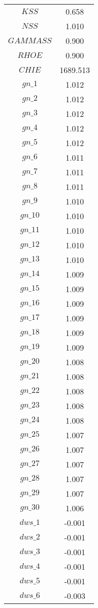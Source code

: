 \begin{center}
\begin{longtable}{cc}
$KSS$ 	 & 	 0.658 \\
$NSS$ 	 & 	 1.010 \\
$GAMMASS$ 	 & 	 0.900 \\
$RHOE$ 	 & 	 0.900 \\
$CHIE$ 	 & 	 1689.513 \\
$gn\_1$ 	 & 	 1.012 \\
$gn\_2$ 	 & 	 1.012 \\
$gn\_3$ 	 & 	 1.012 \\
$gn\_4$ 	 & 	 1.012 \\
$gn\_5$ 	 & 	 1.012 \\
$gn\_6$ 	 & 	 1.011 \\
$gn\_7$ 	 & 	 1.011 \\
$gn\_8$ 	 & 	 1.011 \\
$gn\_9$ 	 & 	 1.010 \\
$gn\_10$ 	 & 	 1.010 \\
$gn\_11$ 	 & 	 1.010 \\
$gn\_12$ 	 & 	 1.010 \\
$gn\_13$ 	 & 	 1.010 \\
$gn\_14$ 	 & 	 1.009 \\
$gn\_15$ 	 & 	 1.009 \\
$gn\_16$ 	 & 	 1.009 \\
$gn\_17$ 	 & 	 1.009 \\
$gn\_18$ 	 & 	 1.009 \\
$gn\_19$ 	 & 	 1.009 \\
$gn\_20$ 	 & 	 1.008 \\
$gn\_21$ 	 & 	 1.008 \\
$gn\_22$ 	 & 	 1.008 \\
$gn\_23$ 	 & 	 1.008 \\
$gn\_24$ 	 & 	 1.008 \\
$gn\_25$ 	 & 	 1.007 \\
$gn\_26$ 	 & 	 1.007 \\
$gn\_27$ 	 & 	 1.007 \\
$gn\_28$ 	 & 	 1.007 \\
$gn\_29$ 	 & 	 1.007 \\
$gn\_30$ 	 & 	 1.006 \\
$dws\_1$ 	 & 	 -0.001 \\
$dws\_2$ 	 & 	 -0.001 \\
$dws\_3$ 	 & 	 -0.001 \\
$dws\_4$ 	 & 	 -0.001 \\
$dws\_5$ 	 & 	 -0.001 \\
$dws\_6$ 	 & 	 -0.003 \\

\end{longtable}
\end{center}
